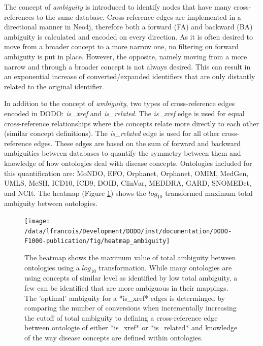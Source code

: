 \documentclass[9pt,a4paper,]{extarticle}
\begin{document}
The concept of \emph{ambiguity} is introduced to identify nodes that have many cross-references to the same database. Cross-reference edges are implemented in a directional manner in Neo4j, therefore both a forward (FA) and backward (BA) ambiguity is calculated and encoded on every direction. As it is often desired to move from a broader concept to a more narrow one, no filtering on forward ambiguity is put in place. However, the opposite, namely moving from a more narrow and through a broader concept is not always desired. This can result in an exponential increase of converted/expanded identifiers that are only distantly related to the original identifier.

In addition to the concept of \emph{ambiguity}, two types of cross-reference edges encoded in DODO: \emph{is\_xref} and \emph{is\_related}. The \emph{is\_xref} edge is used for equal cross-reference relationships where the concepts relate more directly to each other (similar concept definitions). The \emph{is\_related} edge is used for all other cross-reference edges. These edges are based on the sum of forward and backward ambiguities between databases to quantify the symmetry between them and knowledge of how ontologies deal with disease concepts. Ontologies included for this quantification are: MoNDO, EFO, Orphanet, Orphanet, OMIM, MedGen, UMLS, MeSH, ICD10, ICD9, DOID, ClinVar, MEDDRA, GARD, SNOMEDct, and NCIt. The heatmap (Figure \ref{fig:heatmapAmbiguity}) shows the \(log_{10}\) transformed maximum total ambiguity between ontologies.

\begin{figure}

{\centering \texttt{[image: /data/lfrancois/Development/DODO/inst/documentation/DODO-F1000-publication/fig/heatmap\_ambiguity]} 

}

\caption{The heatmap shows the maximum value of total ambiguity between ontologies using a $log_{10}$ transformation. While many ontologies are using concepts of similar level as identified by low total ambiguity, a few can be identified that are more ambiguous in their mappings. The 'optimal' ambiguity for a *is\_xref* edges is determinged by comparing the number of conversions when incrementally increasing the cutoff of total ambiguity to defining a cross-reference edge between ontologie of either *is\_xref* or *is\_related* and knowledge of the way disease concepts are defined within ontologies.}\label{fig:heatmapAmbiguity}
\end{figure}
\end{document}
